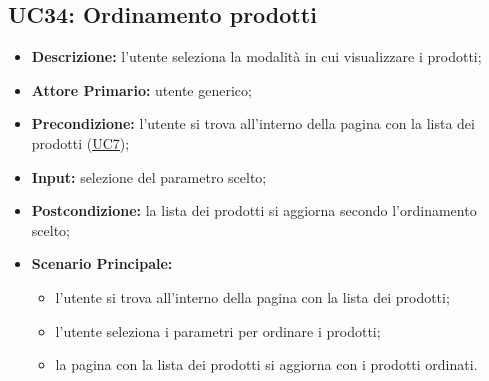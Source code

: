 \subsection{UC34: Ordinamento prodotti}
\label{sec:UC34}
\begin{itemize}
    \item \textbf{Descrizione:} l'utente seleziona la modalità in cui visualizzare i prodotti;
    \item \textbf{Attore Primario:} utente generico;
    \item \textbf{Precondizione:} l'utente si trova all'interno della pagina con la lista dei prodotti (\hyperref[sec:UC7]{\underline{UC7}});
    \item \textbf{Input:} selezione del parametro scelto;
    \item \textbf{Postcondizione:} la lista dei prodotti si aggiorna secondo l'ordinamento scelto;
    \item \textbf{Scenario Principale:}
          \begin{itemize}
              \item l'utente si trova all'interno della pagina con la lista dei prodotti;
              \item l'utente seleziona i parametri per ordinare i prodotti;
              \item la pagina con la lista dei prodotti si aggiorna con i prodotti ordinati.
          \end{itemize}
\end{itemize}